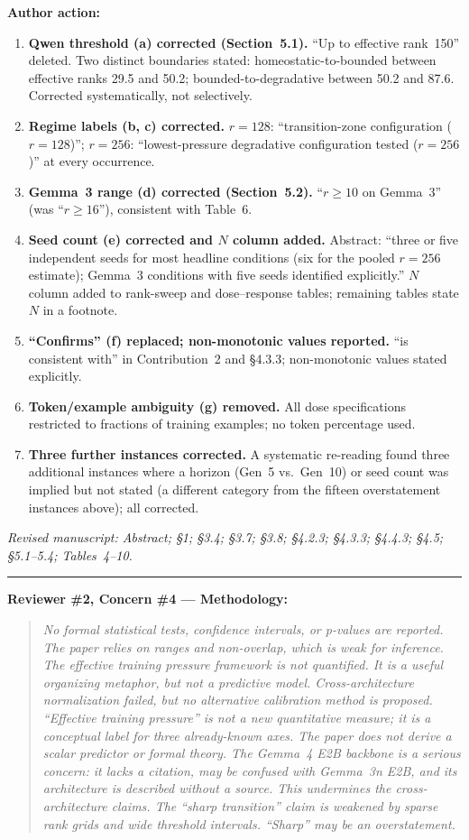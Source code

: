 \documentclass[11pt,a4paper]{article}
\newcommand{\rconcern}[3]{%
  \bigskip\noindent\rule{\linewidth}{0.4pt}\par\medskip
  \noindent\textbf{\textcolor{rccolor}{#1 --- #2:}}\par
  \smallskip
  \begin{quote}\itshape\textcolor{rccolor}{#3}\end{quote}%
}
\newcommand{\arhead}[1]{\medskip\noindent\textbf{#1}\par\smallskip}
\newcommand{\newtext}[1]{\textcolor{chgcolor}{``#1''}}
\newcommand{\msloc}[1]{%
  \smallskip\noindent\textit{Revised manuscript: #1}\par%
}
\begin{document}
\arhead{Author action:}
\begin{enumerate}[leftmargin=1.4em,itemsep=0.3em]
\item \textbf{Qwen threshold (a) corrected (Section~5.1).}
      ``Up to effective rank~150'' deleted. Two distinct boundaries stated: homeostatic-to-bounded between effective ranks 29.5 and 50.2; bounded-to-degradative between 50.2 and 87.6. Corrected systematically,
      not selectively.
\item \textbf{Regime labels (b, c) corrected.}
      $r=128$: \newtext{transition-zone configuration ($r=128$)};
      $r=256$: \newtext{lowest-pressure degradative configuration tested
      ($r=256$)} at every occurrence.
\item \textbf{Gemma~3 range (d) corrected (Section~5.2).}
      \newtext{$r \geq 10$ on Gemma~3} (was ``$r \geq 16$''),
      consistent with Table~6.
\item \textbf{Seed count (e) corrected and $N$ column added.}
      Abstract: \newtext{three or five independent seeds for most
      headline conditions (six for the pooled $r{=}256$ estimate);
      Gemma~3 conditions with five seeds identified explicitly.}
      $N$ column added to rank-sweep and dose--response tables;
      remaining tables state $N$ in a footnote.
\item \textbf{``Confirms'' (f) replaced; non-monotonic values reported.}
      \newtext{is consistent with} in Contribution~2 and \S4.3.3;
      non-monotonic values stated explicitly.
\item \textbf{Token/example ambiguity (g) removed.}
      All dose specifications restricted to fractions of training examples;
      no token percentage used.
\item \textbf{Three further instances corrected.}
      A systematic re-reading found three additional instances where a
      horizon (Gen~5 vs.\ Gen~10) or seed count was implied but not
      stated (a different category from the fifteen overstatement
      instances above); all corrected.
\end{enumerate}

\msloc{Abstract; \S1; \S3.4; \S3.7; \S3.8;
\S4.2.3; \S4.3.3; \S4.4.3; \S4.5;
\S5.1--5.4; Tables~4--10.}

\rconcern{Reviewer \#2, Concern \#4}{Methodology}{No formal statistical
tests, confidence intervals, or p-values are reported. The paper relies
on ranges and non-overlap, which is weak for inference. The effective
training pressure framework is not quantified. It is a useful
organizing metaphor, but not a predictive model.
Cross-architecture normalization failed, but no alternative calibration
method is proposed.
``Effective training pressure'' is not a new quantitative measure; it is
a conceptual label for three already-known axes. The paper does not
derive a scalar predictor or formal theory. The Gemma~4 E2B
backbone is a serious concern: it lacks a citation, may be confused with
Gemma~3n E2B, and its architecture is described without a source. This
undermines the cross-architecture claims. The
``sharp transition'' claim is weakened by sparse rank grids and wide
threshold intervals. ``Sharp'' may be an overstatement.}
\end{document}
